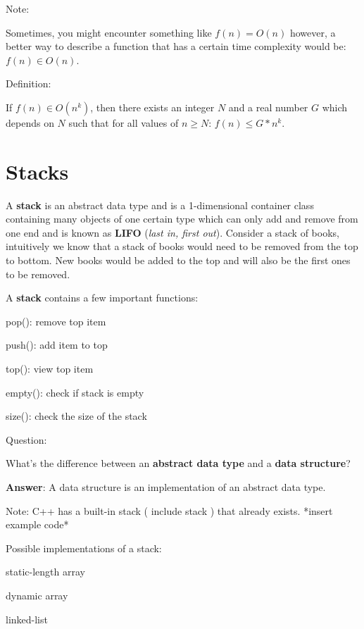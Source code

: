 \documentclass[11pt,a4paper,english]{paper}
\begin{document}
\bigskip

\begin{bluebox}{Note:} {

Sometimes, you might encounter something like $f(n) = O(n)$ however, a better way to describe a function that has a certain time complexity would be: $f(n) \in O(n)$.

  }
\end{bluebox}

\bigskip

\begin{bluebox}{Definition:} {

    If $f(n) \in O(n^{k})$, then there exists an integer $N$ and a real number $G$ which depends on $N$ such that for all values of $n \geq N$: $f(n) \leq G*n^{k}$.

}\end{bluebox}

\bigskip

\section{Stacks}

A \textbf{stack} is an abstract data type and is a 1-dimensional container class containing many objects of one certain type which can only add and remove from one end and is known as \textbf{LIFO} (\textit{last in, first out}). Consider a stack of books, intuitively we know that a stack of books would need to be removed from the top to bottom. New books would be added to the top and will also be the first ones to be removed.

\newpage
\noindent A \textbf{stack} contains a few important functions:
\begin{itemize} {
    \item pop(): remove top item
    \item push(): add item to top
    \item top(): view top item
    \item empty(): check if stack is empty
    \item size(): check the size of the stack
}\end{itemize}

\bigskip

\begin{gbox}{Question:} {

  What's the difference between an \textbf{abstract data type} and a \textbf{data structure}?

  \bigskip
  \textbf{Answer}: A data structure is an implementation of an abstract data type.

}\end{gbox}


\bigskip
\begin{bluebox}{Note:} {
C++ has a built-in stack ( include stack ) that already exists. 
*insert example code*
} \end{bluebox}

\bigskip
\noindent Possible implementations of a stack:
\begin{itemize} {

  \item static-length array
  \item dynamic array
  \item linked-list

}\end{itemize}
\end{document}
